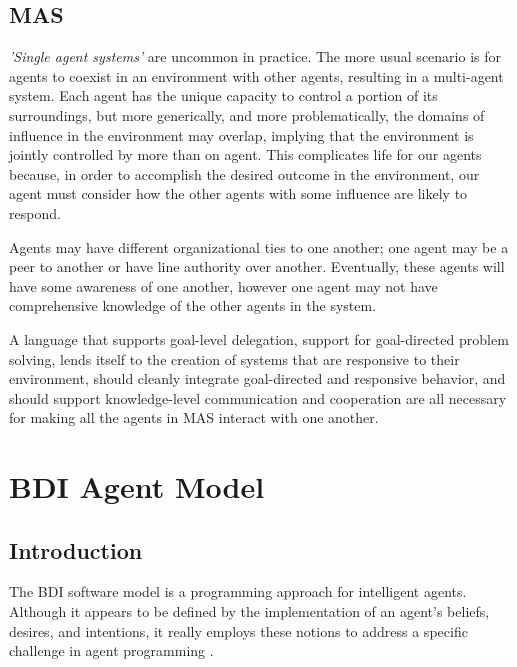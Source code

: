 \subsection{\ac{MAS}}
\textit{'Single agent systems'} are uncommon in practice. The more usual scenario is for agents to coexist in an environment with other agents, resulting in a multi-agent system.
Each agent has the unique capacity to control a portion of its surroundings, but more generically, and more problematically, the domains of influence in the environment may overlap, implying that the environment is jointly controlled by more than on agent. This complicates life for our agents because, in order to accomplish the desired outcome in the environment, our agent must consider how the other agents with some influence are likely to respond.

\vspace{.5cm}

Agents may have different organizational ties to one another; one agent may be a peer to another or have line authority over another. Eventually, these agents will have some awareness of one another, however one agent may not have comprehensive knowledge of the other agents in the system.

\vspace{.5cm}

A language that supports goal-level delegation, support for goal-directed problem solving, lends itself to the creation of systems that are responsive to their environment, should cleanly integrate goal-directed and responsive behavior, and should support knowledge-level communication and cooperation are all necessary for making all the agents in MAS interact with one another.

\section{\ac{BDI} Agent Model}

\subsection{Introduction}

The \ac{BDI} software model is a programming approach for intelligent agents. Although it appears to be defined by the implementation of an agent's beliefs, desires, and intentions, it really employs these notions to address a specific challenge in agent programming \cite{ap}. 

\vspace{.5cm}

